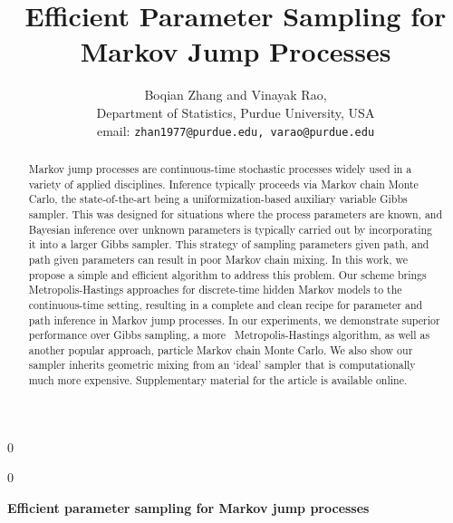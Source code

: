 \documentclass[12pt]{article}
\newcommand{\blind}{0}
\begin{document}
%

\def\spacingset#1{\renewcommand{\baselinestretch}%
{#1}\small\normalsize} \spacingset{1}



\blind
{
  \title{\bf Efficient Parameter Sampling for Markov Jump Processes}
  \author{Boqian Zhang and Vinayak Rao, \\
          Department of Statistics, Purdue University, USA \\
          email: \texttt{zhan1977@purdue.edu, varao@purdue.edu}
  }
  \maketitle
} \fi

\blind
{
  \bigskip
  \bigskip
  \bigskip
  \begin{center}
    {\LARGE\bf Efficient parameter sampling for Markov jump processes}
\end{center}
  \medskip
} \fi
\bigskip
\begin{abstract}
Markov jump processes  are continuous-time stochastic processes widely used in a variety of applied disciplines. 
Inference typically proceeds via Markov chain Monte Carlo, the state-of-the-art being a uniformization-based auxiliary variable Gibbs sampler. 
This was designed for situations where the process parameters are known, and Bayesian inference over unknown parameters is typically carried out by incorporating it into a larger Gibbs sampler.
This strategy of sampling parameters given path, and path given parameters can result in poor Markov chain mixing. 
In this work, we propose a simple and efficient algorithm to address this problem. 
Our scheme brings Metropolis-Hastings approaches for discrete-time hidden Markov models to the continuous-time setting, resulting in a complete and clean recipe for parameter and path inference in Markov jump processes. 
In our experiments, we demonstrate superior performance over Gibbs sampling, a more \naive\ Metropolis-Hastings algorithm, as well as another popular approach, particle Markov chain Monte Carlo.
We also show our sampler inherits geometric mixing from an `ideal' sampler that is computationally much more expensive.
Supplementary material for the article is available online.
\end{abstract}
\end{document}
